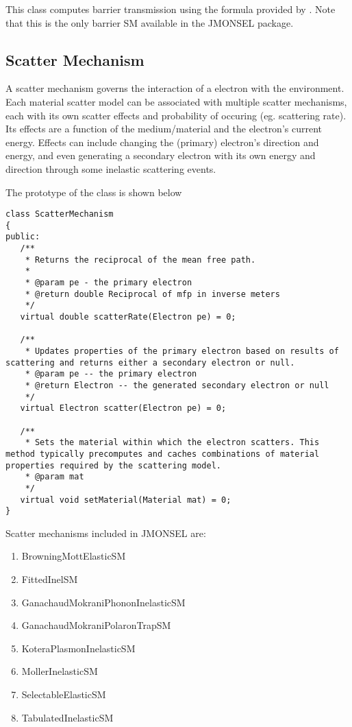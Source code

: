 This class computes barrier transmission using the formula provided by \cite{Landau}. Note that this is the only barrier SM available in the JMONSEL package. 

\subsection{Scatter Mechanism}\label{impl:sm}
A scatter mechanism governs the interaction of a electron with the environment. Each material scatter model can be associated with multiple scatter mechanisms, each with its own scatter effects and probability of occuring (eg. scattering rate). Its effects are a function of the medium/material and the electron's current energy. Effects can include changing the (primary) electron's direction and energy, and even generating a secondary electron with its own energy and direction through some inelastic scattering events. 

The prototype of the class is shown below
\begin{lstlisting}
class ScatterMechanism
{
public:
   /**
    * Returns the reciprocal of the mean free path.
    *
    * @param pe - the primary electron
    * @return double Reciprocal of mfp in inverse meters
    */
   virtual double scatterRate(Electron pe) = 0;

   /**
    * Updates properties of the primary electron based on results of scattering and returns either a secondary electron or null.
    * @param pe -- the primary electron
    * @return Electron -- the generated secondary electron or null
    */
   virtual Electron scatter(Electron pe) = 0;

   /**
    * Sets the material within which the electron scatters. This method typically precomputes and caches combinations of material properties required by the scattering model.
    * @param mat
    */
   virtual void setMaterial(Material mat) = 0;
}
\end{lstlisting}

Scatter mechanisms included in JMONSEL are:
\begin{enumerate}
\item BrowningMottElasticSM
\item FittedInelSM
\item GanachaudMokraniPhononInelasticSM
\item GanachaudMokraniPolaronTrapSM
\item KoteraPlasmonInelasticSM
\item MollerInelasticSM
\item SelectableElasticSM
\item TabulatedInelasticSM
\end{enumerate}

